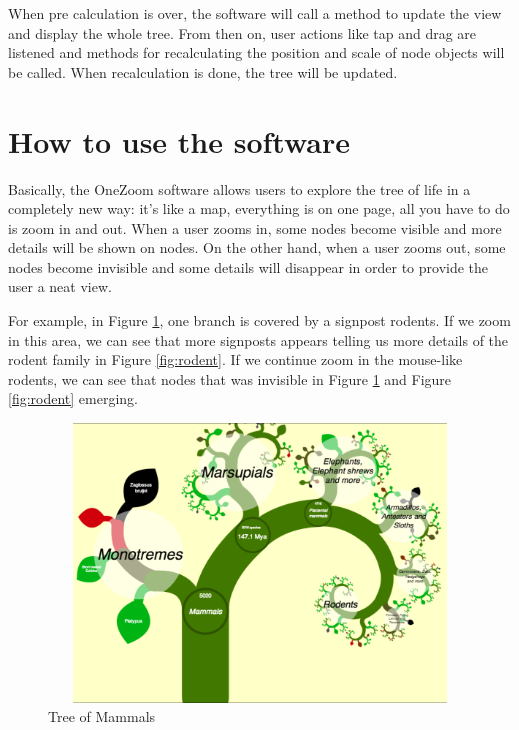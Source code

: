 \documentclass[MSc]{icldt}
\begin{document}
When pre calculation is over, the software will call a method to update the view and display the whole tree. From then on, user actions like tap and drag are listened and methods for recalculating the position and scale of node objects will be called. When recalculation is done, the tree will be updated. 



\section{How to use the software}
Basically, the OneZoom software allows users to explore the tree of life in a completely new way: it's like a map, everything is on one page, all you have to do is zoom in and out. When a user zooms in, some nodes become visible and more details will be shown on nodes. On the other hand, when a user zooms out, some nodes become invisible and some details will disappear in order to provide the user a neat view. 

For example, in Figure \ref{fig:mammal}, one branch is covered by a signpost rodents. If we zoom in this area, we can see that more signposts appears telling us more details of the rodent family in Figure \ref{fig:rodent}. If we continue zoom in the mouse-like rodents, we can see that nodes that was invisible in Figure \ref{fig:mammal} and Figure \ref{fig:rodent} emerging.

\begin{figure}[H]
  \centering
  \includegraphics [width=12.5cm,height=7.4cm]{Mammal}
  \caption{Tree of Mammals}
  \label{fig:mammal}
\end{figure}
\end{document}
